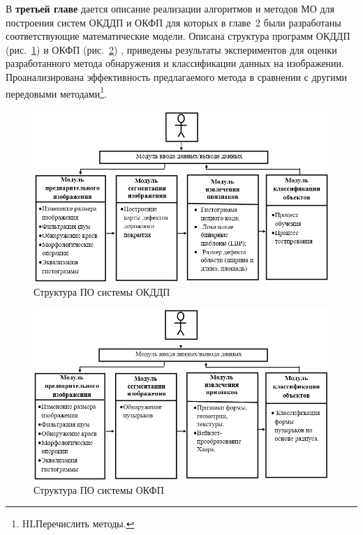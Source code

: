 В \textbf {третьей главе} дается описание реализации алгоритмов и методов МО для построения систем ОКДДП и ОКФП для которых в главе~2 были разработаны соответствующие математические модели. Описана структура программ ОКДДП (рис.~\ref{pic47}) и ОКФП (рис.~\ref{pic59}) , приведены результаты экспериментов для оценки разработанного метода обнаружения и классификации данных на изображении. Проанализирована эффективность предлагаемого метода в сравнении с другими передовыми методами\footnote{HL{Перечислить методы.}}.
\begin{figure}[ht!]
\centering
\vspace{-0.8em}
\includegraphics [width=1\linewidth]{images/pic47.png}
\caption{Структура ПО системы ОКДДП} \label{pic47}
\end{figure}

\begin{figure}[ht!]
\centering
\vspace{-0.8em}
\includegraphics [width=1\linewidth]{images/pic59.png}
\caption{Структура ПО системы ОКФП} \label{pic59}
\end{figure}

